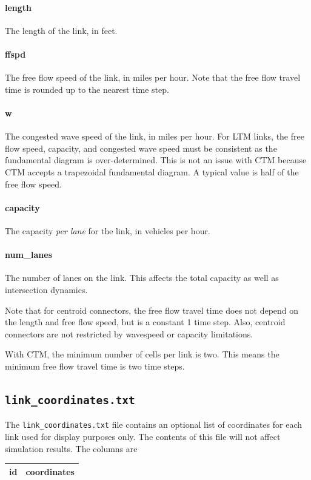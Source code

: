 \paragraph*{length} The length of the link, in feet. 
\paragraph*{ffspd} The free flow speed of the link, in miles per hour. Note that the free flow travel time is rounded up to the nearest time step.
\paragraph*{w} The congested wave speed of the link, in miles per hour. For LTM links, the free flow speed, capacity, and congested wave speed must be consistent as the fundamental diagram is over-determined. This is not an issue with CTM because CTM accepts a trapezoidal fundamental diagram. A typical value is half of the free flow speed.
\paragraph*{capacity} The capacity \textit{per lane} for the link, in vehicles per hour.
\paragraph*{num\_lanes} The number of lanes on the link. This affects the total capacity as well as intersection dynamics.

Note that for centroid connectors, the free flow travel time does not depend on the length and free flow speed, but is a constant 1 time step. Also, centroid connectors are not restricted by wavespeed or capacity limitations. 

With CTM, the minimum number of cells per link is two. This means the minimum free flow travel time is two time steps.

\subsection{\texttt{link\_coordinates.txt}}
The \texttt{link\_coordinates.txt} file contains an optional list of coordinates for each link used for display purposes only. The contents of this file will not affect simulation results. The columns are
\begin{center}
\begin{tabular}{cc}
\hline
id & coordinates\\\hline
\end{tabular}
\end{center}
